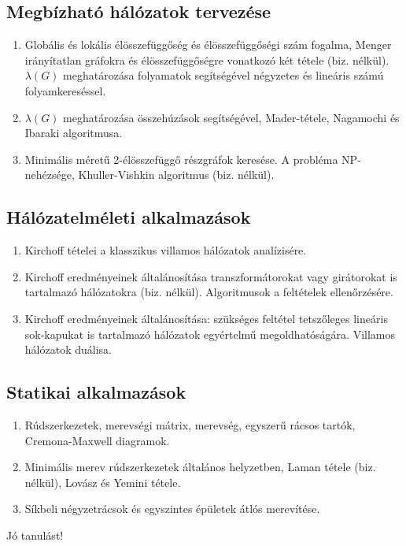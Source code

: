 \subsection*{Megbízható hálózatok tervezése}
\begin{enumerate}[resume]
\item	Globális és lokális élösszefüggőség és élösszefüggőségi szám fogalma, Menger irányítatlan gráfokra és élösszefüggőségre vonatkozó két tétele (biz. nélkül). $\lambda(G)$ meghatározása folyamatok segítségével négyzetes és lineáris számú folyamkereséssel.
\item	$\lambda(G)$ meghatározása összehúzások segítségével, Mader-tétele, Nagamochi és Ibaraki algoritmusa.
\item	Minimális méretű 2-élösszefüggő részgráfok keresése. A probléma NP-nehézsége, Khuller-Vishkin algoritmus (biz. nélkül).
\end{enumerate}

\vspace{3mm}
\subsection*{Hálózatelméleti alkalmazások}
\begin{enumerate}[resume]
\item	Kirchoff tételei a klasszikus villamos hálózatok analízisére.
\item	Kirchoff eredményeinek általánosítása transzformátorokat vagy girátorokat is tartalmazó hálózatokra (biz. nélkül). Algoritmusok a feltételek ellenőrzésére.
\item	Kirchoff eredményeinek általánosítása: szükséges feltétel tetszőleges lineáris sok-kapukat is tartalmazó hálózatok egyértelmű megoldhatóságára. Villamos hálózatok duálisa.
\end{enumerate}

\vspace{3mm}
\subsection*{Statikai alkalmazások}
\begin{enumerate}[resume]
\item	Rúdszerkezetek, merevségi mátrix, merevség, egyszerű rácsos tartók, Cremona-Maxwell diagramok.
\item	Minimális merev rúdszerkezetek általános helyzetben, Laman tétele (biz. nélkül), Lovász és Yemini tétele.
\item	Síkbeli négyzetrácsok és egyszintes épületek átlós merevítése.

\end{enumerate}


\vspace{5mm}
\begin{center}
Jó tanulást!
\end{center}

\normalsize

